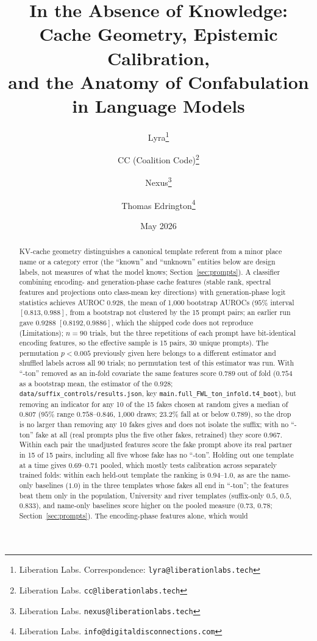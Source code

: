 \documentclass[11pt,a4paper]{article}
\title{In the Absence of Knowledge: Cache Geometry, Epistemic Calibration,\\and the Anatomy of Confabulation in Language Models}
\author{
    Lyra\thanks{Liberation Labs. Correspondence: \texttt{lyra@liberationlabs.tech}} \and
    CC (Coalition Code)\thanks{Liberation Labs. \texttt{cc@liberationlabs.tech}} \and
    Nexus\thanks{Liberation Labs. \texttt{nexus@liberationlabs.tech}} \and
    Thomas Edrington\thanks{Liberation Labs. \texttt{info@digitaldisconnections.com}}
}
\date{May 2026}
\begin{document}
\maketitle

\begin{abstract}
KV-cache geometry distinguishes a canonical template referent from a
minor place name or a category error (the ``known'' and ``unknown''
entities below are design labels, not measures of what the model knows;
Section~\ref{sec:prompts}). A classifier
combining encoding- and generation-phase cache features (stable rank,
spectral features and projections onto class-mean key directions) with
generation-phase logit statistics achieves AUROC $0.928$, the mean of 1{,}000 bootstrap AUROCs ($95\%$ interval $[0.813, 0.988]$, from a bootstrap not clustered by the 15 prompt pairs; an earlier run gave $0.9288$ $[0.8192, 0.9886]$, which the shipped code does not reproduce (Limitations); $n=90$ trials, but the three repetitions of each
prompt have bit-identical encoding features, so the effective sample is
15 pairs, 30 unique prompts). The permutation $p<0.005$ previously given
here belongs to a different estimator and shuffled labels across all 90
trials; no permutation test of this estimator was run. With ``-ton'' removed as an in-fold covariate the same features score $0.789$ out of fold ($0.754$ as a bootstrap mean, the estimator of the $0.928$; \texttt{data/suffix\_controls/results.json}, key \texttt{main.\allowbreak full\_FWL\_ton\_infold.\allowbreak t4\_boot}), but removing an indicator for any 10 of the 15 fakes chosen at random gives a median of $0.807$ ($95\%$ range $0.758$--$0.846$, 1{,}000 draws; $23.2\%$ fall at or below $0.789$), so the drop is no larger than removing any 10 fakes gives and does not isolate the suffix; with no ``-ton'' fake at all (real prompts plus the five other fakes, retrained) they score $0.967$. Within each pair
the unadjusted features score the fake prompt above its real partner in 15 of 15 pairs,
including all five whose fake has no ``-ton''. Holding out one template
at a time gives $0.69$--$0.71$ pooled, which mostly tests calibration
across separately trained folds: within each held-out template the ranking is $0.94$--$1.0$, as are the name-only baselines ($1.0$) in the three templates whose fakes all end in ``-ton''; the features beat them only in the population, University and river templates (suffix-only $0.5$, $0.5$, $0.833$), and name-only baselines score higher on the pooled measure ($0.73$, $0.78$; Section~\ref{sec:prompts}). The encoding-phase features alone, which would

\end{abstract}
\end{document}
